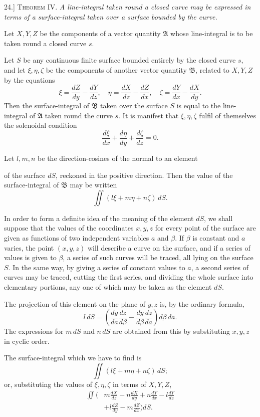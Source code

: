 \documentclass[11pt,a4paper]{article}
\begin{document}
24.] \textsc{Theorem IV.} \textit{A line-integral taken round a closed curve
may be expressed in terms of a surface-integral taken over a surface
bounded by the curve.}

Let \(X,Y,Z\) be the components of a vector quantity \(\mathfrak{A}\)
whose line-integral is to be taken round a closed curve \(s\).

Let \(S\) be any continuous finite surface bounded entirely by the
closed curve \(s\), and let \(\xi,\eta,\zeta\) be the components of
another vector quantity \(\mathfrak{B}\), related to \(X,Y,Z\) by the
equations
\[
\xi=\frac{dZ}{dy}-\frac{dY}{dz},\quad
\eta=\frac{dX}{dz}-\frac{dZ}{dx},\quad
\zeta=\frac{dY}{dx}-\frac{dX}{dy}.
\tag{1}
\]
Then the surface-integral of \(\mathfrak{B}\) taken over the surface
\(S\) is equal to the line-integral of \(\mathfrak{A}\) taken round the
curve \(s\). It is manifest that \(\xi,\eta,\zeta\) fulfil of themselves
the solenoidal condition
\[
\frac{d\xi}{dx}+\frac{d\eta}{dy}+\frac{d\zeta}{dz}=0.
\]

Let \(l,m,n\) be the direction-cosines of the normal to an element

\clearpage

of the surface \(dS\), reckoned in the positive direction. Then the
value of the surface-integral of \(\mathfrak{B}\) may be written
\[
\iint(l\xi+m\eta+n\zeta)\,dS.
\tag{2}
\]

In order to form a definite idea of the meaning of the element \(dS\),
we shall suppose that the values of the coordinates \(x,y,z\) for every
point of the surface are given as functions of two independent variables
\(a\) and \(\beta\). If \(\beta\) is constant and \(a\) varies, the point
\((x,y,z)\) will describe a curve on the surface, and if a series of
values is given to \(\beta\), a series of such curves will be traced,
all lying on the surface \(S\). In the same way, by giving a series of
constant values to \(a\), a second series of curves may be traced,
cutting the first series, and dividing the whole surface into elementary
portions, any one of which may be taken as the element \(dS\).

The projection of this element on the plane of \(y,z\) is, by the
ordinary formula,
\[
l\,dS=\left(\frac{dy}{da}\frac{dz}{d\beta}
-\frac{dy}{d\beta}\frac{dz}{da}\right)d\beta\,da.
\tag{3}
\]
The expressions for \(m\,dS\) and \(n\,dS\) are obtained from this by
substituting \(x,y,z\) in cyclic order.

The surface-integral which we have to find is
\[
\iint(l\xi+m\eta+n\zeta)\,dS;
\tag{4}
\]
or, substituting the values of \(\xi,\eta,\zeta\) in terms of \(X,Y,Z\),
\[
\begin{aligned}
\iint\bigg(&m\frac{dX}{dz}-n\frac{dX}{dy}
+n\frac{dY}{dx}-l\frac{dY}{dz}\\
&+l\frac{dZ}{dy}-m\frac{dZ}{dx}\bigg)dS.
\end{aligned}
\tag{5}
\]
\end{document}
